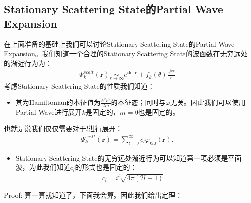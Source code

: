 \subsection{Stationary Scattering State的Partial Wave Expansion}

\bigskip
{}

在上面准备的基础上我们可以讨论Stationary Scattering State的Partial Wave
Expansion。我们知道一个合理的Stationary Scattering State的波函数在无穷远处的渐近行为为：
\begin{align}
  \Psi_k^{scatt}(\mathbf{r})\underset{r\to\infty}{\sim}e^{i
  \mathbf{k} \cdot \mathbf{r}}+f_k(\theta)\frac{e^{ikr}}{r}
\end{align}
考虑Stationary Scattering State的性质我们知道：
\begin{itemize}
  \item 其为Hamiltonian的本征值为$ \displaystyle\frac{\hbar^2 k^2}{2m}
    $的本征态；同时与$ \varphi $无关。因此我们可以使用Partial Wave进行展开$ k $是固定的，$ m=0 $也是固定的。
\end{itemize}
也就是说我们仅仅需要对于$ l $进行展开：
\begin{align}
  \Psi_k^{scatt}(\mathbf{r})=\sum_{l=0}^\infty c_l
  \tilde{\varphi}_{kl0}(\mathbf{r}).
\end{align}
\begin{itemize}
  \item Stationary Scattering State的无穷远处渐近行为可以知道第一项必须是平面波，为此我们知道$ c_l $的形式也是固定的：
    \begin{align}
      c_l =  i^l\sqrt{4\pi(2l+1)}
    \end{align}
\end{itemize}
Proof: 算一算就知道了，下面我会算。因此我们给出定理：

\bigskip
{}


